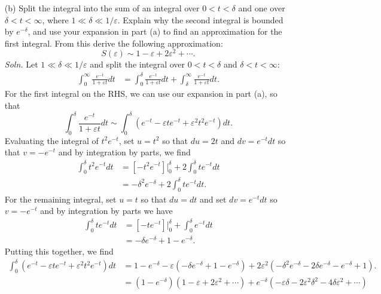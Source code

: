 \documentclass{article}
\begin{document}
\begin{itemize}
\begin{itemize}
        \item[(b)] Split the integral into the sum of an integral over $0 < t < \delta $ and one over $\delta < t < \infty$, where $1 \ll \delta \ll 1/\varepsilon$. Explain why the second integral is bounded by $e^{-\delta}$, and use your expansion in part (a) to find an approximation for the first integral. From this derive the following approximation:
        \[S(\varepsilon) \sim 1 - \varepsilon + 2\varepsilon^2 + \cdots.\]
        \textit{Soln.} Let $ 1 \ll \delta \ll 1/\varepsilon$ and split the integral over $0 < t < \delta$ and $\delta < t <\infty$:
        \begin{align*}
            \int_0^{\infty} \frac{e^{-t}}{1 + \varepsilon t}dt &= \int_0^{\delta} \frac{e^{-t}}{1 + \varepsilon t}dt + \int_{\delta}^{\infty} \frac{e^{-t}}{1 + \varepsilon t}dt.
        \end{align*}
        For the first integral on the RHS, we can use our expansion in part (a), so that
        \[\int_0^{\delta} \frac{e^{-t}}{1 + \varepsilon t}dt \sim \int_0^{\delta} \left(e^{-t} - \varepsilon t e^{-t} + \varepsilon^2t^2e^{-t}\right)dt.\]
        Evaluating the integral of $t^2e^{-t}$, set $u = t^2$ so that $du = 2t$ and $dv = e^{-t}dt$ so that $v = -e^{-t}$ and by integration by parts, we find
        \begin{align*}
            \int_0^{\delta} t^2e^{-t}dt &= \left[-t^2e^{-t}\right]\big|_0^{\delta} + 2\int_0^{\delta}te^{-t}dt \\
            &= -\delta^2e^{-\delta} + 2\int_0^{\delta} te^{-t}dt.
        \end{align*}
        For the remaining integral, set $u = t$ so that $du = dt$ and set $dv = e^{-t}dt$ so $v = -e^{-t}$ and by integration by parts we have
        \begin{align*}
            \int_0^{\delta} te^{-t} dt &= \left[-te^{-t}\right]\big|_0^{\delta} + \int_0^{\delta}e^{-t}dt\\
            &= -\delta e^{-\delta} + 1 - e^{-\delta}.
        \end{align*}
        Putting this together, we find
        \begin{align*}
            \int_0^{\delta} \left(e^{-t} - \varepsilon te^{-t} + \varepsilon^2 t^2e^{-t}\right)dt &= 1 - e^{-\delta} - \varepsilon\left(-\delta e^{-\delta} + 1 - e^{-\delta}\right) + 2\varepsilon^2\left(-\delta^2e^{-\delta} - 2\delta e^{-\delta} - e^{-\delta} + 1\right).\\
            &= (1 - e^{-\delta})(1 - \varepsilon + 2\varepsilon^2 + \cdots) + e^{-\delta}(-\varepsilon \delta - 2\varepsilon^2\delta^2 - 4\delta\varepsilon^2 + \cdots)

\end{align*}
\end{itemize}
\end{itemize}
\end{document}
